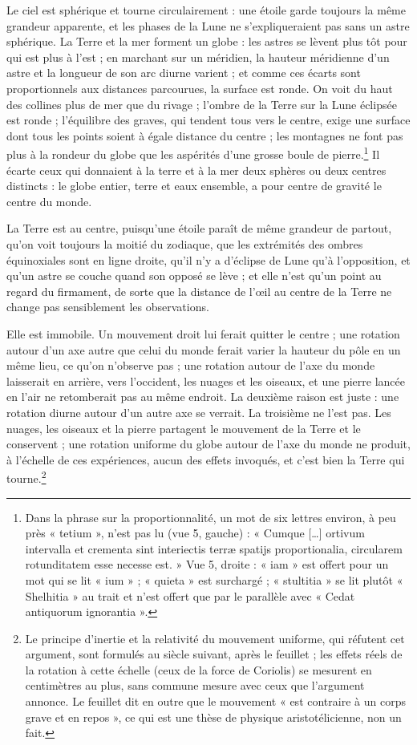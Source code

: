 \documentclass[11pt,a4paper]{article}
\begin{document}
Le ciel est sphérique et tourne circulairement : une étoile garde toujours la
même grandeur apparente, et les phases de la Lune ne s'expliqueraient pas sans
un astre sphérique. La Terre et la mer forment un globe : les astres se lèvent
plus tôt pour qui est plus à l'est ; en marchant sur un méridien, la hauteur
méridienne d'un astre et la longueur de son arc diurne varient ; et comme ces
écarts sont proportionnels aux distances parcourues, la surface est ronde. On
voit du haut des collines plus de mer que du rivage ; l'ombre de la Terre sur la
Lune éclipsée est ronde ; l'équilibre des graves, qui tendent tous vers le
centre, exige une surface dont tous les points soient à égale distance du
centre ; les montagnes ne font pas plus à la rondeur du globe que les aspérités
d'une grosse boule de pierre.\footnote{Dans la phrase sur la proportionnalité,
un mot de six lettres environ, à peu près « tetium », n'est pas lu (vue 5,
gauche) : « Cumque [\ldots] ortivum intervalla et crementa sint interiectis terræ
spatijs proportionalia, circularem rotunditatem esse necesse est. » Vue 5,
droite : « iam » est offert pour un mot qui se lit « ium » ; « quieta » est
surchargé ; « stultitia » se lit plutôt « Shelhitia » au trait et n'est offert
que par le parallèle avec « Cedat antiquorum ignorantia ».} Il écarte ceux qui
donnaient à la terre et à la mer deux sphères ou deux centres distincts : le
globe entier, terre et eaux ensemble, a pour centre de gravité le centre du
monde.

La Terre est au centre, puisqu'une étoile paraît de même grandeur de partout,
qu'on voit toujours la moitié du zodiaque, que les extrémités des ombres
équinoxiales sont en ligne droite, qu'il n'y a d'éclipse de Lune qu'à
l'opposition, et qu'un astre se couche quand son opposé se lève ; et elle n'est
qu'un point au regard du firmament, de sorte que la distance de l'œil au centre
de la Terre ne change pas sensiblement les observations.

Elle est immobile. Un mouvement droit lui ferait quitter le centre ; une
rotation autour d'un axe autre que celui du monde ferait varier la hauteur du
pôle en un même lieu, ce qu'on n'observe pas ; une rotation autour de l'axe du
monde laisserait en arrière, vers l'occident, les nuages et les oiseaux, et une
pierre lancée en l'air ne retomberait pas au même endroit. La deuxième raison
est juste : une rotation diurne autour d'un autre axe se verrait. La troisième
ne l'est pas. Les nuages, les oiseaux et la pierre partagent le mouvement de la
Terre et le conservent ; une rotation uniforme du globe autour de l'axe du monde
ne produit, à l'échelle de ces expériences, aucun des effets invoqués, et c'est
bien la Terre qui tourne.\footnote{Le principe d'inertie et la relativité du
mouvement uniforme, qui réfutent cet argument, sont formulés au siècle suivant,
après le feuillet ; les effets réels de la rotation à cette échelle (ceux de la
force de Coriolis) se mesurent en centimètres au plus, sans commune mesure avec
ceux que l'argument annonce. Le feuillet dit en outre que le mouvement « est
contraire à un corps grave et en repos », ce qui est une thèse de physique
aristotélicienne, non un fait.}
\end{document}
